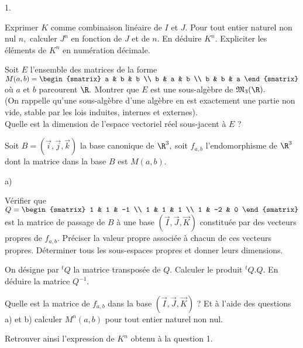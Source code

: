 \documentclass[11pt]{article}%
\begin{document}
\begin{noliste}{1.}
 \setlength{\itemsep}{4mm}
\item Exprimer $K$ comme combinaison linéaire de $I$ et $J.$ Pour tout
entier naturel non nul $n,$ calculer $J^{n}$ en fonction de $J$ et de
$n.$
En déduire $K^{n}.$ Expliciter les éléments de $K^{n}$ en numération
décimale.

\item Soit $E$ l'ensemble des matrices de la forme $M(a,b) = 
\begin{smatrix}
a & b & b \\
b & a & b \\
b & b & a
\end{smatrix}
$ où $a$ et $b$ parcourent $\R.$ Montrer que $E$ est une sous-algèbre
de $\mathfrak{M}_{3}(\R).$\\
(On rappelle qu'une sous-algèbre d'une algèbre en est exactement une
partie
non vide, stable par les lois induites, internes et externes).\\
Quelle est la dimension de l'espace vectoriel réel sous-jacent à $E$ ?

\item Soit $B =
(\overrightarrow{i},\overrightarrow{j},\overrightarrow{k})$ la
base canonique de $\R^{3},$ soit $f_{a,b}$ l'endomorphisme de $\R^{3}$
dont la matrice dans la base $B$ est $M(a,b).$

\begin{noliste}{a)}
 \setlength{\itemsep}{2mm}
\item Vérifier que $Q = 
\begin{smatrix}
1 & 1 & -1 \\
1 & 1 & 1 \\
1 & -2 & 0
\end{smatrix}
$ est la matrice de passage de $B$ à une base
$(\overrightarrow{I},\overrightarrow{J},\overrightarrow{K})$ constituée
par des vecteurs propres
de $f_{a,b}.$ Préciser la valeur propre associée à chacun de ces
vecteurs
propres. Déterminer tous les sous-espaces propres et donner leurs
dimensions.

\item On désigne par $^{t}Q$ la matrice transposée de $Q.$ Calculer le
produit $^{t}Q.Q.$ En déduire la matrice $Q^{-1}.$

\item Quelle est la matrice de $f_{a,b}$ dans la base
$(\overrightarrow{I},\overrightarrow{J},\overrightarrow{K})$ ? Et à
l'aide des questions a) et b)
calculer $M^{n}(a,b)$ pour tout entier naturel non nul.

\item Retrouver ainsi l'expression de $K^{n}$ obtenu à la question 1.
\end{noliste}
\end{noliste}
\end{document}
